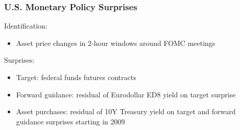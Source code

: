 \documentclass[12pt, aspectratio=169, xcolor=dvipsnames]{beamer}
\begin{document}
%

{%
\begin{frame}
\frametitle{U.S. Monetary Policy Surprises}

Identification:
\begin{itemize}
	\item Asset price changes in 2-hour windows around FOMC meetings %
\end{itemize}

Surprises:
	\begin{itemize}
		\item \alert{Target}: federal funds futures contracts
		\item \alert{Forward guidance}: residual of Eurodollar ED8 yield on target surprise
		\item \alert{Asset purchases}: residual of 10Y Treasury yield on target and forward guidance surprises starting in 2009
	\end{itemize}

\end{frame}
}
\end{document}
